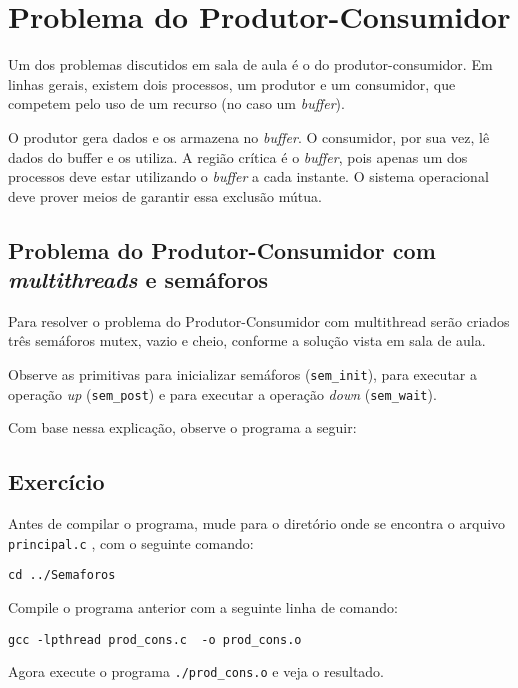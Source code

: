 \chapter{Problema do Produtor-Consumidor}
Um dos problemas discutidos em sala de aula é o do produtor-consumidor. Em linhas gerais, existem dois processos, um produtor e um consumidor, que competem pelo uso de um recurso (no caso um \textit{buffer}).

O produtor gera dados e os armazena no \textit{buffer}. O consumidor, por sua vez, lê dados do buffer e os utiliza. A região crítica é o \textit{buffer}, pois apenas um dos processos deve estar utilizando o \textit{buffer} a cada instante. O sistema operacional deve prover meios de garantir essa exclusão mútua.


\section{Problema do Produtor-Consumidor com \textit{multithreads} e semáforos}
Para resolver o problema do Produtor-Consumidor com multithread serão criados três semáforos mutex, vazio e cheio, conforme a solução vista em sala de aula.

Observe as primitivas para inicializar semáforos (\texttt{sem\_init}), para executar a operação \textit{up} (\texttt{sem\_post}) e para executar a operação \textit{down} (\texttt{sem\_wait}).

Com base nessa explicação, observe o programa a seguir: 


\section{Exercício}
Antes de compilar o programa, mude para o diretório onde se encontra o arquivo \texttt{principal.c} , com o seguinte comando:

\begin{lstlisting}[style=MyBashStyle]
cd ../Semaforos
\end{lstlisting}

Compile o programa anterior com a seguinte linha de comando:

\begin{lstlisting}[style=MyBashStyle]
gcc -lpthread prod_cons.c  -o prod_cons.o
\end{lstlisting}

Agora execute o programa \texttt{./prod\_cons.o} e veja o resultado.

